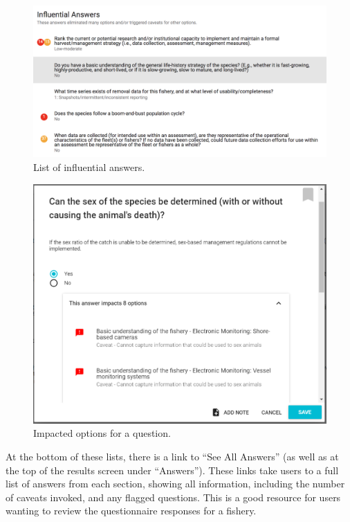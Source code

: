 \documentclass[11pt,]{book}
\begin{document}
\begin{figure}

{\centering \includegraphics[width=0.95\linewidth]{images/influential-answers} 

}

\caption{List of influential answers.}\label{fig:influential-answers}
\end{figure}

\begin{figure}

{\centering \includegraphics[width=0.75\linewidth]{images/influential-answers-expanded} 

}

\caption{Impacted options for a question.}\label{fig:influential-answers-expanded}
\end{figure}

At the bottom of these lists, there is a link to ``See All Answers'' (as well as at the top of the results screen under ``Answers''). These links take users to a full list of answers from each section, showing all information, including the number of caveats invoked, and any flagged questions. This is a good resource for users wanting to review the questionnaire responses for a fishery.
\end{document}

